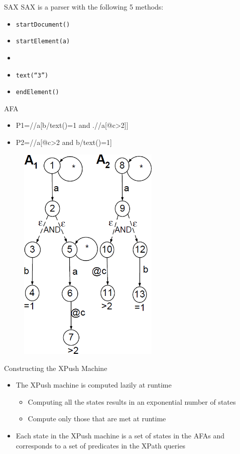 \documentclass[mathserif,serif]{beamer}
\begin{document}
\begin{frame}{SAX}
  SAX is a parser with the following 5 methods:
  \begin{itemize}
    \item \texttt{startDocument()}
    \item \texttt{startElement(a)}
    \item \texttt{\@c}
    \item \texttt{text(``3'')}
    \item \texttt{endElement(\@c)}
  \end{itemize}
\end{frame}

\begin{frame}{AFA}
  \begin{itemize}
    \item P1=//a[b/text()=1 and .//a[@c>2]]
    \item P2=//a[@c>2 and b/text()=1]
  \end{itemize}
  \begin{figure}
    \centering
    \includegraphics[width=0.6\textwidth]{AFA.png}
  \end{figure}
\end{frame}

\begin{frame}{Constructing the XPush Machine}
  \begin{itemize}
    \item The XPush machine is computed lazily at runtime
    \begin{itemize}
      \item Computing all the states results in an exponential number of states
      \item Compute only those that are met at runtime
    \end{itemize}
    \item Each state in the XPush machine is a set of states in the AFAs and corresponds to a set of predicates in the XPath queries 
  \end{itemize}
\end{frame}
\end{document}
